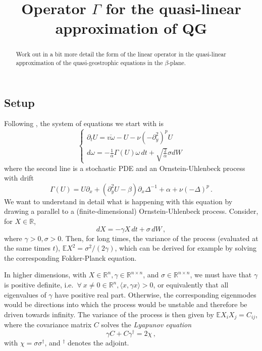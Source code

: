 \documentclass[11pt,reqno,a4paper]{amsart}
\newcommand{\EE}{\mathbb{E}}
\newcommand{\RR}{\mathds{R}}
\theoremstyle{definition}
\begin{document}
\title{Operator $\Gamma$ for the quasi-linear approximation of QG}
\let\thefootnote\relax{} %

\begin{abstract}
  Work out in a bit more detail the form of the linear operator in the
  quasi-linear approximation of the quasi-geostrophic equations in the
  $\beta$-plane.
\end{abstract}

\maketitle
\subsection{Setup}

Following \cite{bouchet-nardini-tangarife:2013}, the system of
equations we start with is
\begin{equation}
  \label{eq:QG-QL}
  \begin{cases}
    \partial_t U = \overline{v\omega}- U -\nu(-\partial_y^2)^p U\\
    d \omega = -\frac{1}{\alpha}\Gamma(U)\omega\,dt  + \sqrt{\frac{2}{\alpha}} \sigma dW
  \end{cases}
\end{equation}
where the second line is a stochastic PDE and an Ornstein-Uhlenbeck
process with drift 
\begin{equation}
  \label{eq:Gamma}
  \Gamma(U) = U\partial_x +(\partial_y^2 U-\beta)\partial_x \Delta^{-1} + \alpha + \nu(-\Delta)^p\,.
\end{equation}
We want to understand in detail what is happening with this equation
by drawing a parallel to a (finite-dimensional) Ornstein-Uhlenbeck
process. Consider, for $X\in\RR$,
\begin{equation}
  \label{eq:OU}
  dX = -\gamma X\,dt + \sigma\,dW\,,
\end{equation}
where $\gamma>0, \sigma>0$. Then, for long times, the variance of the
process (evaluated at the same times $t$), $\EE X^2 =
\sigma^2/(2\gamma)$, which can be derived for example by solving the
corresponding Fokker-Planck equation.

In higher dimensions, with $X\in\RR^n, \gamma\in\RR^{n\times n}$, and
$\sigma\in\RR^{n\times n}$, we must have that $\gamma$ is positive
definite, i.e.~$\forall\ x\ne0\in\RR^n, \langle x, \gamma x\rangle >
0$, or equivalently that all eigenvalues of $\gamma$ have positive
real part. Otherwise, the corresponding eigenmodes would be directions
into which the process would be unstable and therefore be driven
towards infinity. The variance of the process is then given by $\EE
X_i X_j = C_{ij}$, where the covariance matrix $C$ solves the
\emph{Lyapunov equation}
\begin{equation}
  \label{eq:Lyapunov}
  \gamma C + C \gamma^\dagger = 2 \chi\,,
\end{equation}
with $\chi = \sigma \sigma^\dagger$, and ${}^\dagger$ denotes the adjoint.
\end{document}
